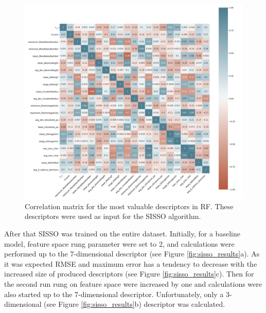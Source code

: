 \begin{figure}[H]
\centering
\captionsetup{justification=centering,margin=2cm}
	\includegraphics[width=160mm]{fig/ml_fig/corr_matrix.png}
	\caption[Correlation matrix for the most valuable descriptors in RF. ]{Correlation matrix for the most valuable descriptors in RF. These descriptors were used as input for the SISSO algorithm.}
\label{fig:corr_matrix}
\end{figure}

After that SISSO was trained on the entire dataset. Initially, for a baseline model, feature space rung parameter were set to 2, and calculations were performed up to the 7-dimensional descriptor (see Figure \ref{fig:sisso_results}a). As it was expected RMSE and maximum error has a tendency to decrease with the increased size of produced descriptors (see Figure \ref{fig:sisso_results}c).
Then for the second run rung on feature space were increased by one and calculations were also started up to the 7-dimensional descriptor. Unfortunately, only a 3-dimensional (see Figure \ref{fig:sisso_results}b) descriptor was calculated.

